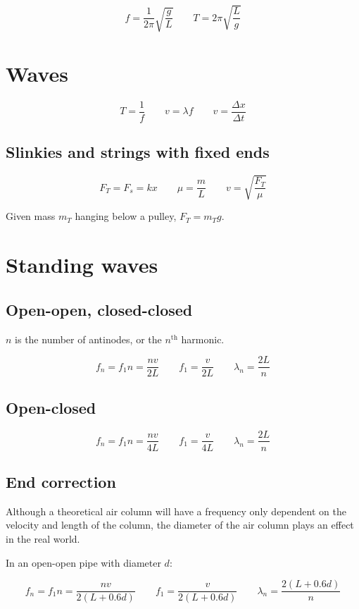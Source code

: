 \[
	f = \frac{1}{2\pi}\sqrt{\frac{g}{L}} \qquad 
	T = 2\pi \sqrt{\frac{L}{g}}
\]

\section{Waves}

\[
	T = \frac{1}{f} \qquad
	v = \lambda f \qquad
	v = \frac{\Delta x}{\Delta t}
\]

\subsection{Slinkies and strings with fixed ends}

\[
	F_T = F_s = kx \qquad
	\mu = \frac{m}{L} \qquad
	v = \sqrt{\frac{F_T}{\mu}}
\]

Given mass $m_T$ hanging below a pulley, $F_T = m_T g$.

\columnbreak

\section{Standing waves}

\subsection{Open-open, closed-closed}

$n$ is the number of antinodes, or the $n^\text{th}$ harmonic.

\[
	f_n = f_1 n = \frac{nv}{2L} \qquad f_1 = \frac{v}{2L} \qquad \lambda_n = \frac{2L}{n}
\]

\subsection{Open-closed}

\[
	f_n = f_1 n = \frac{nv}{4L} \qquad f_1 = \frac{v}{4L} \qquad \lambda_n = \frac{2L}{n}
\]

\subsection{End correction}

Although a theoretical air column will have a frequency only dependent on the velocity and length of the column, the diameter of the air column plays an effect in the real world.

In an open-open pipe with diameter $d$:

\[
	f_n = f_1 n = \frac{nv}{2(L + 0.6d)} \qquad f_1 = \frac{v}{2(L + 0.6d)} \qquad \lambda_n = \frac{2(L + 0.6d)}{n}
\]

